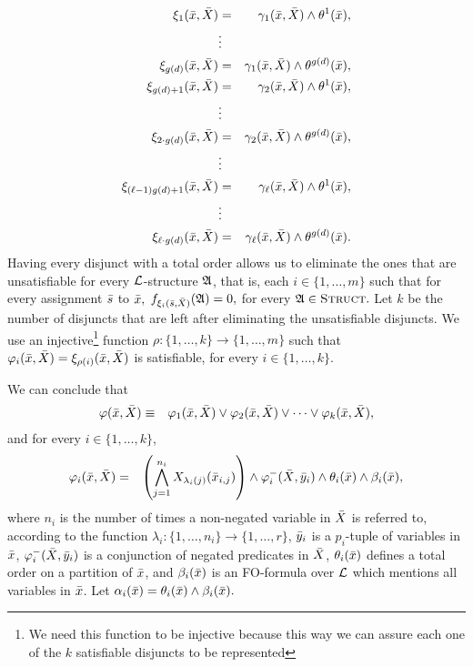 \begin{enumerate}
	\begin{eqnarray*}
		\xi_1(\bar{x},\bar{X}) &=& \gamma_1(\bar{x},\bar{X}) \wedge \theta^1(\bar{x}), \\
		& \vdots & \\
		\xi_{g(d)}(\bar{x},\bar{X}) &=& \gamma_1(\bar{x},\bar{X}) \wedge \theta^{g(d)}(\bar{x}), \\
		\xi_{g(d)+1}(\bar{x},\bar{X}) &=& \gamma_2(\bar{x},\bar{X}) \wedge \theta^1(\bar{x}), \\
		& \vdots & \\
		\xi_{2\cdot g(d)}(\bar{x},\bar{X}) &=& \gamma_2(\bar{x},\bar{X}) \wedge \theta^{g(d)}(\bar{x}), \\
		& \vdots & \\
		\xi_{(\ell-1) g(d)+1}(\bar{x},\bar{X}) &=& \gamma_{\ell}(\bar{x},\bar{X}) \wedge \theta^1(\bar{x}), \\
		& \vdots & \\
		\xi_{\ell \cdot g(d)}(\bar{x},\bar{X}) &=& \gamma_{\ell}(\bar{x},\bar{X}) \wedge \theta^{g(d)}(\bar{x}).
	\end{eqnarray*}
	Having every disjunct with a total order allows us to eliminate the ones that are unsatisfiable for every $\L$-structure $\mathfrak{A}$, that is, each $i\in\{1,\ldots,m\}$ such that for every assignment $\bar{s}$ to $\bar{x},$ $f_{\xi_i(\bar{s},\bar{X})}(\mathfrak{A}) = 0,$ for every $\mathfrak{A}\in\text{\sc Struct}.$ Let $k$ be the number of disjuncts that are left after eliminating the unsatisfiable disjuncts. We use an injective\footnote[3]{We need this function to be injective because this way we can assure each one of the $k$ satisfiable disjuncts to be represented} function $\rho:\{1,\ldots,k\}\to\{1,\ldots,m\}$ such that $\varphi_i(\bar{x},\bar{X}) = \xi_{\rho(i)}(\bar{x},\bar{X})$ is satisfiable, for every $i\in\{1,\ldots,k\}.$
	
	We can conclude that
	\begin{eqnarray*}
		\varphi(\bar{x},\bar{X}) &\equiv& \varphi_1(\bar{x},\bar{X}) \vee \varphi_2(\bar{x},\bar{X}) \vee \dots  \vee \varphi_k(\bar{x},\bar{X}),
	\end{eqnarray*}
	and for every $i\in\{1,\ldots,k\}$,
	\begin{eqnarray*}
		\varphi_i(\bar{x},\bar{X}) &=& \left( \bigwedge_{j=1}^{n_i} X_{\lambda_i(j)}(\bar{x}_{i,j}) \right) \wedge \varphi^{-}_i(\bar{X},\bar{y}_i) \wedge \theta_i(\bar{x}) \wedge \beta_i(\bar{x}),
	\end{eqnarray*}
	where $n_i$ is the number of times a non-negated variable in $\bar{X}$ is referred to, according to the function $\lambda_i:\{1,\ldots,n_i\}\to\{1,\ldots,r\}$, $\bar{y}_i$ is a $p_i$-tuple of variables in $\bar{x}$, $\varphi_i^{-}(\bar{X},\bar{y}_i)$ is a conjunction of negated predicates in $\bar{X}$, $\theta_i(\bar{x})$ defines a total order on a partition of $\bar{x}$, and $\beta_i(\bar{x})$ is an FO-formula over $\L$ which mentions all variables in $\bar{x}$. Let $\alpha_i(\bar{x}) = \theta_i(\bar{x})\wedge\beta_i(\bar{x}).$
	

\end{enumerate}
